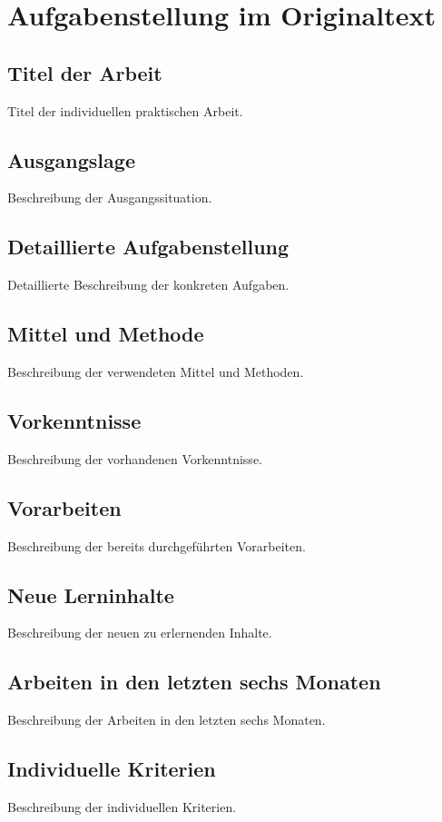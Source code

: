 
\chapter{Aufgabenstellung im Originaltext}

\section{Titel der Arbeit}
Titel der individuellen praktischen Arbeit.

\section{Ausgangslage}
Beschreibung der Ausgangssituation.

\section{Detaillierte Aufgabenstellung}
Detaillierte Beschreibung der konkreten Aufgaben.

\section{Mittel und Methode}
Beschreibung der verwendeten Mittel und Methoden.

\section{Vorkenntnisse}
Beschreibung der vorhandenen Vorkenntnisse.

\section{Vorarbeiten}
Beschreibung der bereits durchgeführten Vorarbeiten.

\section{Neue Lerninhalte}
Beschreibung der neuen zu erlernenden Inhalte.

\section{Arbeiten in den letzten sechs Monaten}
Beschreibung der Arbeiten in den letzten sechs Monaten.

\section{Individuelle Kriterien}
Beschreibung der individuellen Kriterien.


